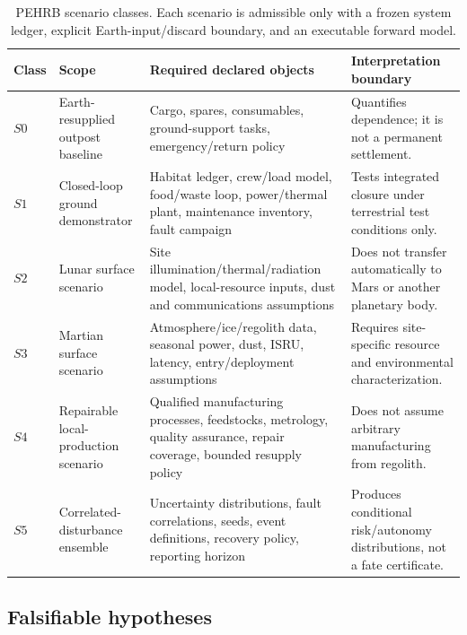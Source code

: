 \documentclass[10pt,conference]{IEEEtran}
\begin{document}
\begin{table}[!t]
\caption{PEHRB scenario classes. Each scenario is admissible only with a frozen system ledger, explicit Earth-input/discard boundary, and an executable forward model.}
\label{tab:scenario-classes}
\centering
\footnotesize
\setlength{\tabcolsep}{2.5pt}
\begin{tabular}{p{}p{}p{}p{}}
\toprule
Class & Scope & Required declared objects & Interpretation boundary \\
\midrule
$S0$ & Earth-resupplied outpost baseline & Cargo, spares, consumables, ground-support tasks, emergency/return policy & Quantifies dependence; it is not a permanent settlement. \\
$S1$ & Closed-loop ground demonstrator & Habitat ledger, crew/load model, food/waste loop, power/thermal plant, maintenance inventory, fault campaign & Tests integrated closure under terrestrial test conditions only. \\
$S2$ & Lunar surface scenario & Site illumination/thermal/radiation model, local-resource inputs, dust and communications assumptions & Does not transfer automatically to Mars or another planetary body. \\
$S3$ & Martian surface scenario & Atmosphere/ice/regolith data, seasonal power, dust, ISRU, latency, entry/deployment assumptions & Requires site-specific resource and environmental characterization. \\
$S4$ & Repairable local-production scenario & Qualified manufacturing processes, feedstocks, metrology, quality assurance, repair coverage, bounded resupply policy & Does not assume arbitrary manufacturing from regolith. \\
$S5$ & Correlated-disturbance ensemble & Uncertainty distributions, fault correlations, seeds, event definitions, recovery policy, reporting horizon & Produces conditional risk/autonomy distributions, not a fate certificate. \\
\bottomrule
\end{tabular}
\end{table}

\subsection{Falsifiable hypotheses}
\end{document}
